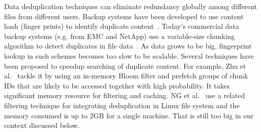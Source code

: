 Data deduplication techniques can eliminate redundancy globally among different files from different users. 
Backup systems have been developed to use content hash (finger prints) to identify duplicate 
content~\cite{venti02,Rhea2008}.
Today's commercial data backup systems (e.g. from EMC and NetApp)
use a variable-size chunking algorithm to detect duplicates in file data~\cite{similar94,hydrastor09}.
As data grows to be big, fingerprint lookup in such schemes
becomes too slow to be scalable.
Several techniques have been proposed to speedup searching of duplicate 
content. For example,  
Zhu et al.~\cite{bottleneck08} tackle it 
by using an in-memory Bloom filter and prefetch groups of chunk IDs that are likely to be 
accessed together with high probability. It takes significant memory resource for filtering and caching.
NG et al.~\cite{ NGmiddleware2011}  use  
a related filtering technique for integrating deduplication in Linux  file system and the memory
consumed is up to 2GB for a single machine. That is still too big in our context discussed below. 

